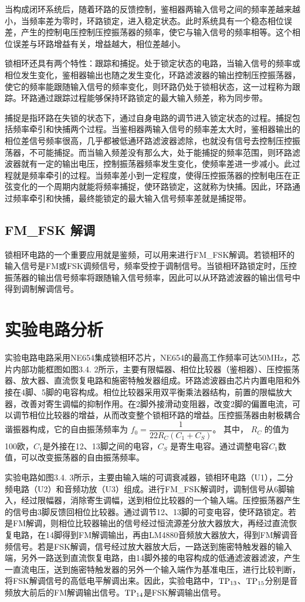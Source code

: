 \documentclass{../source/Experiment}
\begin{document}
当构成闭环系统后，随着环路的反馈控制，鉴相器两输入信号之间的频率差越来越小，当频率差为零时，环路锁定，进入稳定状态。此时系统具有一个稳态相位误差，产生的控制电压控制压控振荡器的频率，使它与输入信号的频率相等。这个相位误差与环路增益有关，增益越大，相位差越小。

锁相环还具有两个特性：跟踪和捕捉。处于锁定状态的电路，当输入信号的频率或相位发生变化，鉴相器输出也随之发生变化，环路滤波器的输出控制压控振荡器，使它的频率能跟随输入信号的频率变化，则环路仍处于锁相状态，这一过程称为跟踪。环路通过跟踪过程能够保持环路锁定的最大输入频差，称为同步带。

捕捉是指环路在失锁的状态下，通过自身电路的调节进入锁定状态的过程。捕捉包括频率牵引和快捕两个过程。当鉴相器两输入信号的频率差太大时，鉴相器输出的相位差信号频率很高，几乎都被低通环路滤波器滤除，也就没有信号去控制压控振荡器，不可能捕捉。而当输入频差没有那么大，处于能捕捉的频率范围，则环路滤波器就有一定的输出电压，控制振荡器频率发生变化，使频率差进一步减小。此过程就是频率牵引的过程。当频率差小到一定程度，使得压控振荡器的控制电压在正弦变化的一个周期内就能将频率捕捉，使环路锁定，这就称为快捕。因此，环路通过频率牵引和快捕，最终能锁定的最大输入信号频率差就是捕捉带。


\subsection{FM\_FSK 解调}
锁相环电路的一个重要应用就是鉴频，可以用来进行FM\_FSK解调。若锁相环的输入信号是FM或FSK调频信号，频率受控于调制信号。当锁相环路锁定时，压控振荡器的输出信号频率将跟随输入信号频率，因此可以从环路滤波器的输出信号中得到调制解调信号。

\section{实验电路分析}
实验电路电路采用NE654集成锁相环芯片，NE654的最高工作频率可达50MHz，芯片内部功能框图如图3.4. 2所示，主要有限幅器、相位比较器（鉴相器）、压控振荡器、放大器、直流恢复电路和施密特触发器组成。环路滤波器由芯片内置电阻和外接在4脚、5脚的电容构成。相位比较器采用双平衡乘法器结构，前置的限幅放大器，改善对寄生调幅的抑制作用。在2脚外接滑动变阻器，改变2脚的偏置电流，可以调节相位比较器的增益，从而改变整个锁相环路的增益。压控振荡器由射极耦合谐振器构成，它的自由振荡频率为
$f_0 = \dfrac{1}{22R_C(C_1 + C_S)}$。
其中， $R_C$ 的值为100欧，$C_1$是外接在12、13脚之间的电容，$C_S$ 是寄生电容。通过调整电容$C_1$数值，可以改变振荡器的自由振荡频率。

实验电路如图3.4. 3所示，主要由输入端的可调衰减器，锁相环电路（U1），二分频电路（U2）和音频功放（U3）组成。进行FM\_FSK解调时，调制信号从6脚输入，经过限幅器，消除寄生调幅，送到相位比较器的一个输入端。压控振荡器产生的信号由3脚反馈回相位比较器。通过调节12、13脚的可变电容，使环路锁定。若是FM解调，则相位比较器输出的信号经过恒流源差分放大器放大，再经过直流恢复电路，在14脚得到FM解调输出，再由LM4880音频放大器放大，得到FM解调音频信号。若是FSK解调，信号经过放大器放大后，一路送到施密特触发器的输入端，另外一路送到直流恢复电路，由14脚外接的电容构成的低通滤波器滤波，产生一直流电压，送到施密特触发器的另外一个输入端作为基准电压，进行比较判断，将FSK解调信号的高低电平解调出来。因此，实验电路中，$\rm TP_{13}$、$\rm TP_{15}$分别是音频放大前后的FM解调输出信号。$\rm TP_{14}$是FSK解调输出信号。
\end{document}
